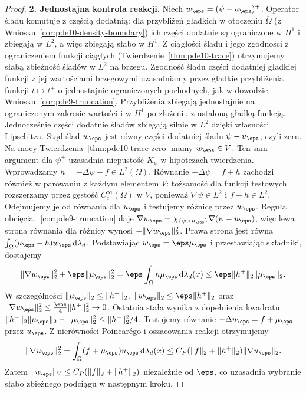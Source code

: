 \begin{proof}
\textbf{2. Jednostajna kontrola reakcji.}
Niech $w_\eps=(\psi-u_\eps)^+$.
Operator śladu komutuje z częścią dodatnią:
dla przybliżeń gładkich w otoczeniu $\overline\Omega$
(z Wniosku~\ref{cor:pde10-density-boundary})
ich części dodatnie są ograniczone w $H^1$
i zbiegają w $L^2$,
a więc zbiegają słabo w $H^1$.
Z ciągłości śladu i jego zgodności z ograniczeniem
funkcji ciągłych (Twierdzenie~\ref{thm:pde10-trace})
otrzymujemy słabą zbieżność śladów w $L^2$
na brzegu. Zgodność śladu części dodatniej
gładkiej funkcji z jej wartościami brzegowymi
uzasadniamy przez gładkie przybliżenia funkcji
$t\mapsto t^+$ o jednostajnie ograniczonych pochodnych,
jak w dowodzie Wniosku~\ref{cor:pde9-truncation}.
Przybliżenia zbiegają jednostajnie na ograniczonym
zakresie wartości i w $H^1$ po złożeniu z ustaloną
gładką funkcją. Jednocześnie części dodatnie śladów
zbiegają silnie w $L^2$ dzięki własności Lipschitza.
Stąd ślad $w_\eps$ jest równy części dodatniej
śladu $\psi-u_\eps$, czyli zeru.
Na mocy Twierdzenia~\ref{thm:pde10-trace-zero}
mamy $w_\eps\in V$. Ten sam argument dla $\psi^+$
uzasadnia niepustość $K_\psi$ w hipotezach twierdzenia.
Wprowadzamy $h=-\Delta\psi-f\in L^2(\Omega)$.
Równanie $-\Delta\psi=f+h$ zachodzi również
w parowaniu z każdym elementem $V$:
tożsamość dla funkcji testowych rozszerzamy
przez gęstość $C_c^\infty(\Omega)$ w $V$,
ponieważ $\nabla\psi\in L^2$ i $f+h\in L^2$.
Odejmujemy je od równania dla $u_\eps$
i testujemy różnicę przez $w_\eps$. Reguła obcięcia
~\ref{cor:pde9-truncation} daje
$\nabla w_\eps=\chi_{\{\psi>u_\eps\}}
\nabla(\psi-u_\eps)$, więc lewa strona równania
dla różnicy wynosi $-\|\nabla w_\eps\|_2^2$.
Prawa strona jest równa
$\int_\Omega(\mu_\eps-h)w_\eps\,\mathrm d\lambda_d$.
Podstawiając $w_\eps=\eps\mu_\eps$ i przestawiając
składniki, dostajemy
\begin{equation}\label{eq:pde29-penalty}
 \|\nabla w_\eps\|_2^2+\eps\|\mu_\eps\|_2^2
 =\eps\int_\Omega h\mu_\eps\,\mathrm d\lambda_d(x)
 \le\eps\|h^+\|_2\|\mu_\eps\|_2.
\end{equation}
W szczególności $\|\mu_\eps\|_2\le\|h^+\|_2$,
$\|w_\eps\|_2\le\eps\|h^+\|_2$ oraz
$\|\nabla w_\eps\|_2^2\le
\tfrac{\eps}{4}\|h^+\|_2^2\to0$.
Ostatnia stała wynika z dopełnienia kwadratu:
$\|h^+\|_2\|\mu_\eps\|_2-\|\mu_\eps\|_2^2
\le\|h^+\|_2^2/4$.
Testujemy równanie $-\Delta u_\eps=f+\mu_\eps$ przez $u_\eps$.
Z nierówności Poincarégo i oszacowania reakcji otrzymujemy
\[
 \|\nabla u_\eps\|_2^2
 =\int_\Omega(f+\mu_\eps)u_\eps\,\mathrm d\lambda_d(x)
 \le C_P(\|f\|_2+\|h^+\|_2)\|\nabla u_\eps\|_2.
\]
Zatem $\|u_\eps\|_V\le C_P(\|f\|_2+\|h^+\|_2)$
niezależnie od $\eps$, co uzasadnia wybranie słabo zbieżnego
podciągu w następnym kroku.


\end{proof}

